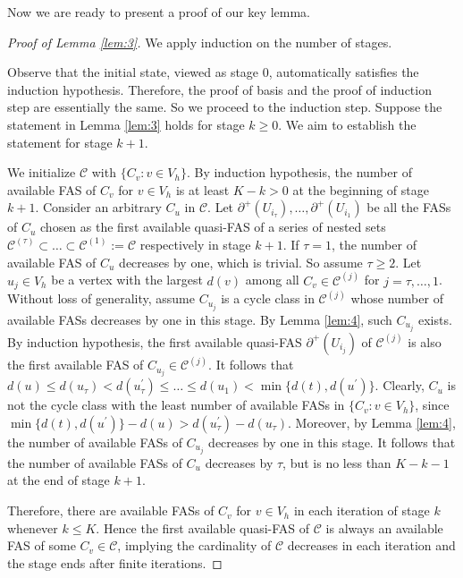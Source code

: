 \documentclass[11pt]{article}
\begin{document}
Now we are ready to present a proof of our key lemma.

\begin{proof}[Proof of Lemma \ref{lem:3}]
We apply induction on the number of stages.

Observe that the initial state, viewed as stage 0, automatically satisfies the induction hypothesis. Therefore, the proof of basis and the proof of induction step are essentially the same. So we proceed to the induction step. Suppose the statement in Lemma \ref{lem:3} holds for stage $k\geq 0$. We aim to establish the statement for stage $k+1$.

We initialize $\mathcal{C}$ with $\{C_v:v\in V_h\}$. By induction hypothesis,  the number of available FAS of $C_v$ for $v\in V_h$ is at least $K-k>0$ at the beginning of stage $k+1$. Consider an arbitrary $C_u$ in $\mathcal{C}$. Let $\partial^+(U_{i_\tau}),\dots,\partial^+(U_{i_1})$ be all the FASs of $C_u$ chosen as the first available quasi-FAS of a series of nested sets $\mathcal{C}^{(\tau)}\subset\dots\subset\mathcal{C}^{(1)}:=\mathcal{C}$ respectively in stage $k+1$. If $\tau=1$, the number of available FAS of $C_u$ decreases by one, which is trivial. So assume $\tau\geq 2$. Let $u_j\in V_h$ be a vertex with the largest $d(v)$ among all $C_v\in \mathcal{C}^{(j)}$ for $j=\tau,\dots,1$. Without loss of generality, assume $C_{u_j}$ is a cycle class in $\mathcal{C}^{(j)}$ whose number of available FASs decreases by one in this stage. By Lemma \ref{lem:4}, such $C_{u_j}$ exists. By induction hypothesis, the first available quasi-FAS $\partial^+(U_{i_j})$ of $\mathcal{C}^{(j)}$ is also the first available FAS of $C_{u_j}\in \mathcal{C}^{(j)}$. It follows that $d(u)\leq d(u_\tau)< d(u^\prime_\tau)\leq\dots\leq d(u_1)< \min\{d(t),d(u^\prime)\}$. Clearly, $C_u$ is not the cycle class with the least number of available FASs in $\{C_v:v\in V_h\}$, since $\min\{d(t),d(u^\prime)\}-d(u)> d(u_\tau^\prime)-d(u_\tau)$. Moreover, by Lemma \ref{lem:4}, the number of available FASs of $C_{u_j}$ decreases by one in this stage. It follows that the number of available FASs of $C_u$ decreases by $\tau$, but is no less than $K-k-1$ at the end of stage $k+1$.

Therefore, there are available FASs of $C_v$ for $v\in V_h$ in each iteration of stage $k$ whenever $k\leq K$. Hence the first available quasi-FAS of $\mathcal{C}$ is always an available FAS of some $C_v\in \mathcal{C}$, implying the cardinality of $\mathcal{C}$ decreases in each iteration and the stage ends after finite iterations.
\end{proof}
\end{document}
